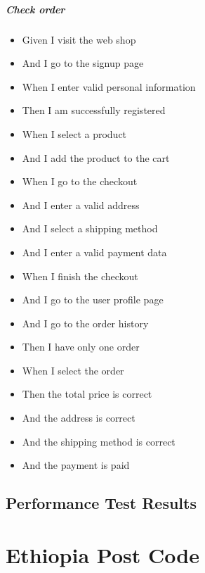 \begin{appendices}
\paragraph{Check order}
\begin{itemize}
	\item Given I visit the web shop	
	\item And I go to the signup page
	\item When I enter valid personal information
	\item Then I am successfully registered
	\item When I select a product
	\item And I add the product to the cart
	\item When I go to the checkout
	\item And I enter a valid address
	\item And I select a shipping method
	\item And I enter a valid payment data
	\item When I finish the checkout
	\item And I go to the user profile page
	\item And I go to the order history
	\item Then I have only one order
	\item When I select the order
	\item Then the total price is correct
	\item And the address is correct
	\item And the shipping method is correct
	\item And the payment is paid
\end{itemize}

\section{Performance Test Results}






\chapter{Ethiopia Post Code}

\end{appendices}
